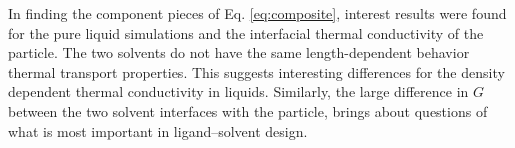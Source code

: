 In finding the component pieces of Eq. \ref{eq:composite}, interest results were found for the pure liquid simulations and the interfacial thermal conductivity of the particle.
The two solvents do not have the same length-dependent behavior thermal transport properties. This suggests interesting differences for the density dependent thermal conductivity in liquids.
Similarly, the large difference in $G$ between the two solvent interfaces with the particle, brings about questions of what is most important in ligand--solvent design.
